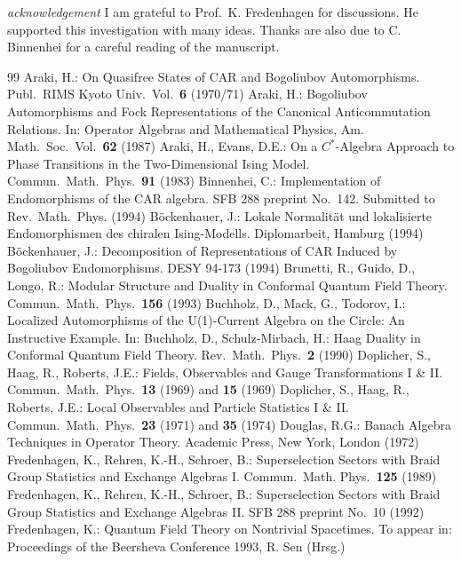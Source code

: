 \documentclass[10pt,a4paper]{article}
\begin{document}
{\it acknowledgement}
I am grateful to Prof.~K. Fredenhagen
for discussions. He supported this investigation with
many ideas. Thanks are also due to C. Binnenhei
for a careful reading of the manuscript.

\begin{thebibliography}{99}
 Araki, H.: On Quasifree States
of CAR and Bogoliubov Automorphisms. Publ.~RIMS Kyoto
Univ.~Vol.~{\bf 6} (1970/71)
 Araki, H.: Bogoliubov Automorphisms
and Fock Representations of the Canonical Anticommutation
Relations. In: Operator Algebras and Mathematical
Physics, Am. Math.~Soc.~Vol.~{\bf 62} (1987)
 Araki, H., Evans, D.E.: On a
$C^*$-Algebra Approach to Phase Transitions in the
Two-Dimensional Ising Model.
Commun.~Math.~Phys.~{\bf 91} (1983)
 Binnenhei, C.: Implementation of
Endomorphisms of the CAR algebra. SFB 288 preprint
No.~142. Submitted to Rev.~Math.~Phys. (1994)
  B{\"o}ckenhauer, J.: Lokale
Normalit{\"a}t und lokalisierte Endomorphismen des chiralen
Ising-Modells. Diplomarbeit, Hamburg (1994)
 B{\"o}ckenhauer, J.: Decomposition
of Representations of CAR Induced by Bogoliubov
Endomorphisms. DESY 94-173 (1994)
 Brunetti, R., Guido, D., Longo, R.:
Modular Structure and Duality in Conformal Quantum
Field Theory. Commun.~Math.~Phys.~{\bf 156} (1993)
 Buchholz, D., Mack, G., Todorov, I.:
Localized Automorphisms of the U(1)-Current
Algebra on the Circle: An Instructive Example.
In: \cite{Kast}
 Buchholz, D., Schulz-Mirbach, H.: Haag
Duality in Conformal Quantum Field Theory.
Rev.~Math.~Phys.~{\bf 2} (1990)
 Doplicher, S., Haag, R., Roberts, J.E.:
Fields, Observables and Gauge Transformations I \& II.
Commun.~Math.~Phys.~{\bf 13} (1969) and {\bf 15} (1969)
 Doplicher, S., Haag, R., Roberts, J.E.:
Local Observables and Particle Statistics I \&  II.
Commun.~Math.~Phys.~{\bf 23} (1971) and {\bf 35} (1974)
 Douglas, R.G.: Banach Algebra
Techniques in Operator Theory. Academic Press, New York,
London (1972)
 Fredenhagen, K., Rehren, K.-H., Schroer, B.:
Superselection Sectors with Braid Group Statistics and
Exchange Algebras I. Commun.~Math. Phys.~{\bf 125} (1989)
 Fredenhagen, K., Rehren, K.-H., Schroer, B.:
Superselection Sectors with Braid Group Statistics and
Exchange Algebras II. SFB 288 preprint No.~10 (1992)
 Fredenhagen, K.: Quantum
Field Theory on Nontrivial Spacetimes. To appear in:
Proceedings of the Beersheva Conference 1993, R. Sen (Hrsg.)

\end{thebibliography}
\end{document}
